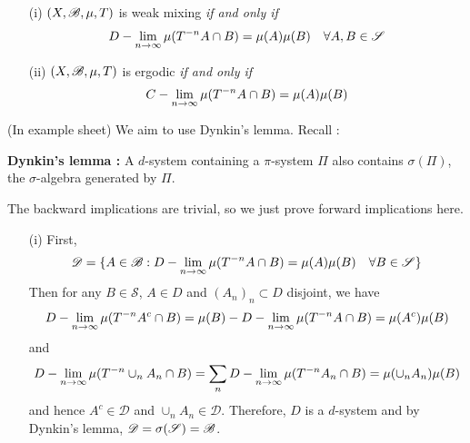 \documentclass[12pt,a4paper]{report}
\newenvironment{proof}
{\begin{changemargin}{1cm}{0.5cm} 
	}%
	{\end{changemargin}
}
\newenvironment{subproof}
{\begin{changemargin}{0.5cm}{0.5cm}
	}%
	{\end{changemargin}
}
\begin{document}
\begin{itemize}
\item[(i)] $(X,\mathscr{B}, \mu, T)$ is weak mixing \emph{if and only if}
\begin{align*}
D-\lim_{n\rightarrow \infty} \mu(T^{-n} A \cap B) = \mu(A) \mu(B) \quad \forall A,B \in \mathscr{S}
\end{align*}
\item[(ii)] $(X,\mathscr{B}, \mu, T)$ is ergodic \emph{if and only if}
\begin{align*}
C-\lim_{n\rightarrow \infty} \mu(T^{-n}A \cap B) = \mu(A) \mu(B)
\end{align*}
\end{itemize}
\begin{proof}
\pf (In example sheet) We aim to use Dynkin's lemma. Recall :
\begin{subproof}
\textbf{Dynkin's lemma :} A $d$-system containing a $\pi$-system $\Pi$ also contains $\sigma(\Pi)$, the $\sigma$-algebra generated by $\Pi$.
\end{subproof}
The backward implications are trivial, so we just prove forward implications here.
\begin{itemize}
\item[(i)] First,
\begin{align*}
\mathscr{D} = \{A\in \mathscr{B} : D-\lim_{n\rightarrow \infty} \mu(T^{-n} A \cap B) = \mu(A) \mu(B) \quad \forall B\in \mathscr{S} \}
\end{align*}
Then for any $B\in \mathscr{S}$, $A\in D$ and $(A_n)_{n} \subset D$ disjoint, we have
\begin{align*}
D-\lim_{n\rightarrow \infty} \mu(T^{-n} A^c \cap B) = \mu(B) - D-\lim_{n\rightarrow \infty} \mu(T^{-n} A \cap B) = \mu(A^c) \mu(B)
\end{align*}
and
\begin{align*}
D-\lim_{n\rightarrow \infty} \mu(T^{-n} \cup_n A_n \cap B) = \sum_n D-\lim_{n\rightarrow \infty} \mu(T^{-n} A_n \cap B) = \mu(\cup_n A_n) \mu(B)
\end{align*}
and hence $A^c \in \mathscr{D}$ and $\cup_n A_n \in \mathscr{D}$. Therefore, $D$ is a $d$-system and by Dynkin's lemma, $\mathscr{D} = \sigma(\mathscr{S}) = \mathscr{B}$.


\end{itemize}
\end{proof}
\end{document}
